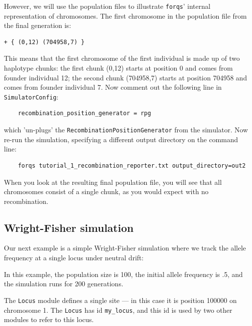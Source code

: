 \documentclass{article}
\newcommand{\codeinput}[1]{\begin{small}  \end{small}}
\begin{document}
However, we will use the population files to illustrate \texttt{forqs}' internal 
representation of chromosomes.  The first chromosome in the population file
from the final generation is:
\begin{small}
\begin{verbatim}
+ { (0,12) (704958,7) }
\end{verbatim}
\end{small}
This means that the first chromosome of the first individual is made up of two
haplotype chunks: the first chunk (0,12) starts at position 0 and comes from
founder individual 12; the second chunk (704958,7) starts at position 704958
and comes from founder individual 7.
Now comment out the following line in \texttt{SimulatorConfig}:
\begin{small}
\begin{verbatim}
    recombination_position_generator = rpg
\end{verbatim}
\end{small}
which 'un-plugs' the \texttt{RecombinationPositionGenerator} from the simulator.
Now re-run the simulation, specifying a different output directory on the command line:
\begin{small}
\begin{verbatim}
    forqs tutorial_1_recombination_reporter.txt output_directory=out2
\end{verbatim}
\end{small}
When you look at the resulting final population file, you will see that all
chromosomes consist of a single chunk, as you would expect with no recombination.


\subsection{Wright-Fisher simulation}

Our next example is a simple Wright-Fisher simulation where we track the
allele frequency at a single locus under neutral drift:

\codeinput{../examples/tutorial_2_wright_fisher.txt}

In this example, the population size is 100, the initial allele frequency is
.5, and the simulation runs for 200 generations.

The \texttt{Locus} module defines a single site --- in this case it is position
100000 on chromosome 1.  The \texttt{Locus} has id \texttt{my\_locus}, and this
id is used by two other modules to refer to this locus.
\end{document}
